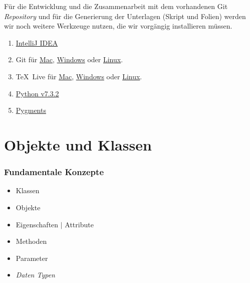 \mode*
\begin{Exercise}[%
title={Installation der Entwicklungsumgebung},
label={ex:installation-intellij}]

    Für die Entwicklung und die Zusammenarbeit mit dem vorhandenen Git \emph{Repository}
    und für die Generierung der Unterlagen (Skript und Folien) werden wir noch weitere
    Werkzeuge nutzen, die wir vorgängig installieren müssen.

    \begin{enumerate}
        \item \href{https://www.jetbrains.com/idea}{IntelliJ IDEA}
        \item Git für \href{https://git-scm.com/download/mac}{Mac},
        \href{https://git-scm.com/download/win}{Windows} oder
        \href{https://git-scm.com/download/linux}{Linux}.
        \item \TeX\ Live für \href{http://tug.org/cgi-bin/mactex-download/MacTeX.pkg}{Mac},
        \href{http://mirror.ctan.org/systems/texlive/tlnet/install-tl-windows.exe}{Windows} oder
        \href{http://mirror.ctan.org/systems/texlive/tlnet/install-tl-unx.tar.gz}{Linux}.
        \item \href{https://www.python.org/downloads/}{Python v7.3.2}
        \item \href{http://pygments.org/}{Pygments}
    \end{enumerate}

\end{Exercise}


\section{Objekte und Klassen}
\label{sec:contents}

\begin{frame}[fragile]
    \frametitle<presentation>{Fundamentale Konzepte}

    \begin{itemize}
        \item Klassen
        \item Objekte
        \item Eigenschaften $|$ Attribute
        \item Methoden
        \item Parameter
        \item \emph{Daten Typen}
    \end{itemize}
\end{frame}


